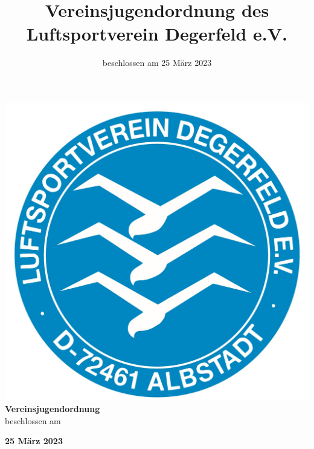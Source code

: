 \documentclass[10pt,a4paper,parskip=half]{scrartcl}
\title{Vereinsjugendordnung des Luftsportverein Degerfeld e.V.}
\subtitle{beschlossen am 25 März 2023}
\begin{document}
\thispagestyle{plain}
\begin{center}
  \includegraphics[scale=0.2]{../Logo.png}\\[5ex]
  
  \Huge{\textbf{Vereinsjugendordnung}}\\[1.5ex]
  \large{beschlossen am}\\[1.5ex]
  
  \normalsize
  
  \textbf{\Large{25 März 2023}}\\
  
\end{center}
\end{document}
